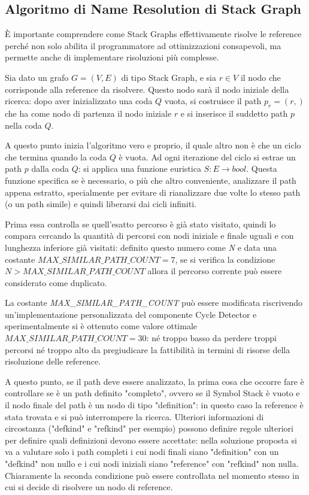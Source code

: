 \subsection{Algoritmo di Name Resolution di Stack Graph}

\`E importante comprendere come Stack Graphs effettivamente risolve le reference perch\'e non solo abilita il programmatore ad ottimizzazioni consapevoli, ma permette anche di implementare risoluzioni pi\`u complesse.

\par
Sia dato un grafo $G = (V, E)$ di tipo Stack Graph, e sia $r \in V$ il nodo che corrisponde alla reference da risolvere. Questo nodo sar\`a il nodo iniziale della ricerca: dopo aver inizializzato una coda $Q$ vuota, si costruisce il path $p_r = (r,)$ che ha come nodo di partenza il nodo iniziale $r$ e si inserisce il suddetto path $p$ nella coda $Q$.

\par
A questo punto inizia l'algoritmo vero e proprio, il quale altro non \`e che un ciclo che termina quando la coda $Q$ \`e vuota.
Ad ogni iterazione del ciclo si estrae un path $p$ dalla coda $Q$: si applica una funzione euristica $S : E \rightarrow bool$.
Questa funzione specifica se \`e necessario, o pi\`u che altro conveniente, analizzare il path appena estratto, specialmente per evitare di rianalizzare due volte lo stesso path (o un path simile) e quindi liberarsi dai cicli infiniti.

\par
Prima essa controlla se quell'esatto percorso \`e gi\`a stato visitato, quindi lo compara cercando la quantit\`a di percorsi con nodi iniziale e finale uguali e con lunghezza inferiore gi\`a visitati: definito questo numero come \emph{N} e data una costante $MAX\_SIMILAR\_PATH\_COUNT = 7$, se si verifica la condizione $N > MAX\_SIMILAR\_PATH\_COUNT$ allora il percorso corrente pu\`o essere considerato come duplicato.

\par
La costante \emph{MAX\_SIMILAR\_PATH\_COUNT} pu\`o essere modificata riscrivendo un'implementazione personalizzata del componente Cycle Detector e sperimentalmente si \`e ottenuto come valore ottimale $MAX\_SIMILAR\_PATH\_COUNT = 30$: n\'e troppo basso da perdere troppi percorsi n\'e troppo alto da pregiudicare la fattibilit\`a in termini di risorse della risoluzione delle reference.

\par
A questo punto, se il path deve essere analizzato, la prima cosa che occorre fare \`e controllare se \`e un path definito "completo", ovvero se il Symbol Stack \`e vuoto e il nodo finale del path \`e un nodo di tipo "definition": in questo caso la reference \`e stata trovata e si pu\`o interrompere la ricerca.
Ulteriori informazioni di circostanza ("defkind" e "refkind" per esempio) possono definire regole ulteriori per definire quali definizioni devono essere accettate: nella soluzione proposta si va a valutare solo i path completi i cui nodi finali siano "definition" con un "defkind" non nullo e i cui nodi iniziali siano "reference" con "refkind" non nulla. Chiaramente la seconda condizione pu\`o essere controllata nel momento stesso in cui si decide di risolvere un nodo di reference.

